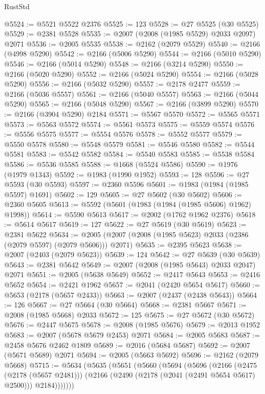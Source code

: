 \begin{lexlean}{RustStd}
\begin{coremodule}
@5524 := @5521 @5522 @2376
@5525 := 123
@5528 := @27 @5525 (@30 @5525)
@5529 := @2381 @5528
@5535 := @2007 (@2008 (@1985 @5529) @2033 @2097) @2071
@5536 := @2005 @5535
@5538 := @2162 (@2079 @5529)
@5540 := @2166 (@4998 @5290)
@5542 := @2166 (@5006 @5290)
@5544 := @2166 (@5010 @5290)
@5546 := @2166 (@5014 @5290)
@5548 := @2166 (@3214 @5290)
@5550 := @2166 (@5020 @5290)
@5552 := @2166 (@5024 @5290)
@5554 := @2166 (@5028 @5290)
@5556 := @2166 (@5032 @5290)
@5557 := @2178 @2477
@5559 := @2166 (@5036 @5557)
@5561 := @2166 (@5040 @5557)
@5563 := @2166 (@5044 @5290)
@5565 := @2166 (@5048 @5290)
@5567 := @2166 (@3899 @5290)
@5570 := @2166 (@3904 @5290) @2184
@5571 := @5567 @5570
@5572 := @5565 @5571
@5573 := @5563 @5572
@5574 := @5561 @5573
@5575 := @5559 @5574
@5576 := @5556 @5575
@5577 := @5554 @5576
@5578 := @5552 @5577
@5579 := @5550 @5578
@5580 := @5548 @5579
@5581 := @5546 @5580
@5582 := @5544 @5581
@5583 := @5542 @5582
@5584 := @5540 @5583
@5585 := @5538 @5584
@5586 := @5536 @5585
@5588 := @1668 (@5524 @5586)
@5590 := @1976 (@1979 @1343)
@5592 := @1983 (@1990 @1952)
@5593 := 128
@5596 := @27 @5593 (@30 @5593)
@5597 := @2360 @5596
@5601 := @1983 (@1984 (@1985 @5597) @1691)
@5602 := 129
@5605 := @27 @5602 (@30 @5602)
@5606 := @2360 @5605
@5613 := @5592 (@5601 (@1983 (@1984 (@1985 @5606) @1962) @1998))
@5614 := @5590 @5613
@5617 := @2002 (@1762 @1962 @2376)
@5618 := @5614 @5617
@5619 := 127
@5622 := @27 @5619 (@30 @5619)
@5623 := @2381 @5622
@5634 := @2005 (@2007 (@2008 (@1985 @5623) @2033 (@2386 (@2079 @5597) (@2079 @5606))) @2071)
@5635 := @2395 @5623
@5638 := @2007 (@2403 (@2079 @5623))
@5639 := 124
@5642 := @27 @5639 (@30 @5639)
@5643 := @2381 @5642
@5649 := @2007 (@2008 (@1985 @5643) @2033 @2047) @2071
@5651 := @2005 (@5638 @5649)
@5652 := @2417 @5643
@5653 := @2416 @5652
@5654 := @2421 @1962
@5657 := @2041 (@2420 @5654 @5617)
@5660 := @5653 (@2178 (@5657 @2433))
@5663 := @2007 (@2437 (@2438 @5643))
@5664 := 126
@5667 := @27 @5664 (@30 @5664)
@5668 := @2381 @5667
@5671 := @2008 (@1985 @5668) @2033
@5672 := 125
@5675 := @27 @5672 (@30 @5672)
@5676 := @2447 @5675
@5678 := @2008 (@1985 @5676)
@5679 := @2013 @1952
@5683 := @2007 (@5678 @5679 @2453) @2071
@5684 := @2005 @5683
@5687 := @2458 @5676 @2462 @1809
@5689 := @2016 (@5684 @5687)
@5692 := @2007 (@5671 @5689) @2071
@5694 := @2005 (@5663 @5692)
@5696 := @2162 (@2079 @5668)
@5715 := @5634
    (@5635
      (@5651
        (@5660
          (@5694
            (@5696
              (@2166
                (@2475 (@2178 (@5657 @2481)))
                (@2166 (@2490 (@2178 (@2041 (@2491 @5654 @5617) @2500))) @2184)))))))

\end{coremodule}
\end{lexlean}
